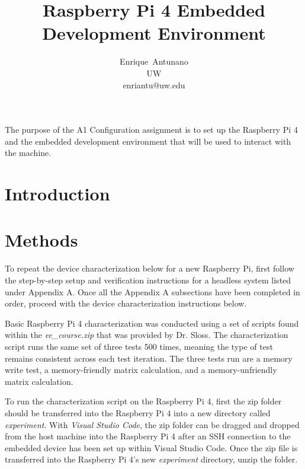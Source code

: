 \documentclass[journal]{IEEEtran}
\begin{document}
    \title{Raspberry Pi 4 Embedded Development Environment}

    \author{Enrique~Antunano\\UW\\enriantu@uw.edu}


    \maketitle

    \begin{abstract}

    \end{abstract}
    The purpose of the A1 Configuration assignment is to set up the Raspberry Pi 4 and the embedded development environment that will be used to interact with the machine. 
    \section{Introduction}

    \section{Methods}
    To repeat the device characterization below for a new Raspberry Pi, first follow the step-by-step setup and verification instructions for a headless system listed under Appendix A. 
    Once all the Appendix A subsections have been completed in order, proceed with the device characterization instructions below.

    Basic Raspberry Pi 4 characterization was conducted using a set of scripts found within the \emph{ee\_course.zip} that was provided by Dr. Sloss. 
    The characterization script runs the same set of three tests 500 times, meaning the type of test remains consistent across each test iteration.
    The three tests run are a memory write test, a memory-friendly matrix calculation, and a memory-unfriendly matrix calculation.

    To run the characterization script on the Raspberry Pi 4, first the zip folder should be transferred into the Raspberry Pi 4 into a new directory called \emph{experiment}.
    With \emph{Visual Studio Code}, the zip folder can be dragged and dropped from the host machine into the Raspberry Pi 4 after an SSH connection to the embedded device has been set up within Visual Studio Code.
    Once the zip file is transferred into the Raspberry Pi 4's new \emph{experiment} directory, unzip the folder. \newline
\end{document}
